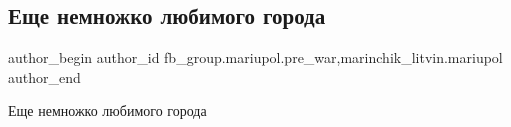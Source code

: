  
 
 
 
 

\subsection{Еще немножко любимого города}
\label{sec:27_02_2023.fb.fb_group.mariupol.pre_war.5.yeshche_nemnozhko_ly}
 
\ifcmt
 author_begin
   author_id fb_group.mariupol.pre_war,marinchik_litvin.mariupol
 author_end
\fi

Еще немножко любимого города

